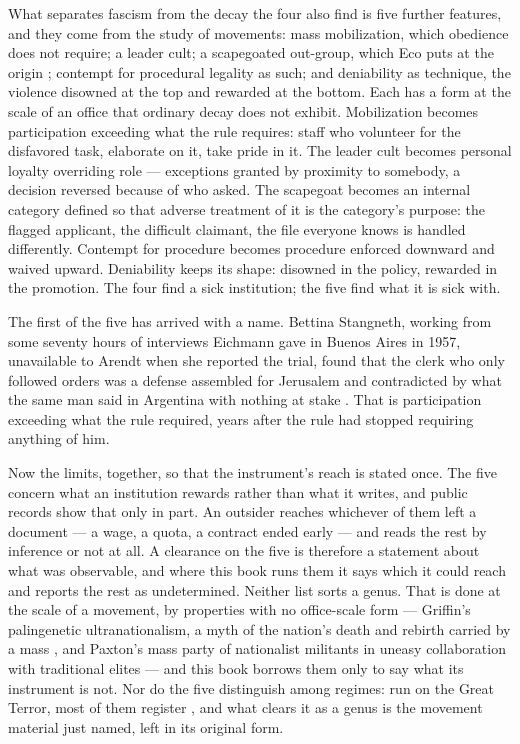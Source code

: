 What separates fascism from the decay the four also find is five further features, and they come from the study of movements: mass mobilization, which obedience does not require; a leader cult; a scapegoated out-group, which Eco puts at the origin \autocite{eco1995urfascism}; contempt for procedural legality as such; and deniability as technique, the violence disowned at the top and rewarded at the bottom. Each has a form at the scale of an office that ordinary decay does not exhibit. Mobilization becomes participation exceeding what the rule requires: staff who volunteer for the disfavored task, elaborate on it, take pride in it. The leader cult becomes personal loyalty overriding role — exceptions granted by proximity to somebody, a decision reversed because of who asked. The scapegoat becomes an internal category defined so that adverse treatment of it is the category's purpose: the flagged applicant, the difficult claimant, the file everyone knows is handled differently. Contempt for procedure becomes procedure enforced downward and waived upward. Deniability keeps its shape: disowned in the policy, rewarded in the promotion. The four find a sick institution; the five find what it is sick with.

The first of the five has arrived with a name. Bettina Stangneth, working from some seventy hours of interviews Eichmann gave in Buenos Aires in 1957, unavailable to Arendt when she reported the trial, found that the clerk who only followed orders was a defense assembled for Jerusalem and contradicted by what the same man said in Argentina with nothing at stake \autocite{stangneth2014eichmann}. That is participation exceeding what the rule required, years after the rule had stopped requiring anything of him.

Now the limits, together, so that the instrument's reach is stated once. The five concern what an institution rewards rather than what it writes, and public records show that only in part. An outsider reaches whichever of them left a document — a wage, a quota, a contract ended early — and reads the rest by inference or not at all. A clearance on the five is therefore a statement about what was observable, and where this book runs them it says which it could reach and reports the rest as undetermined. Neither list sorts a genus. That is done at the scale of a movement, by properties with no office-scale form — Griffin's palingenetic ultranationalism, a myth of the nation's death and rebirth carried by a mass \autocite{griffin1991nature}, and Paxton's mass party of nationalist militants in uneasy collaboration with traditional elites \autocite{paxton2004anatomy} — and this book borrows them only to say what its instrument is not. Nor do the five distinguish among regimes: run on the Great Terror, most of them register \autocite{getty2002excesses}, and what clears it as a genus is the movement material just named, left in its original form.

